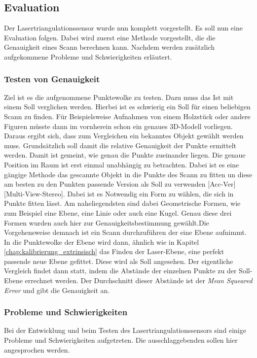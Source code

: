 	\subsection{Evaluation}
		
		Der Lasertriangulationssensor wurde nun komplett vorgestellt. Es soll nun eine Evaluation folgen. Dabei wird zuerst eine Methode vorgestellt, die die Genauigkeit eines Scann berechnen kann. Nachdem werden zusätzlich aufgekommene Probleme und Schwierigkeiten erläutert.   
		\subsubsection{Testen von Genauigkeit}
		Ziel ist es die aufgenommene Punktewolke zu testen. Dazu muss das \glqq Ist\grqq{} mit einem \glqq Soll\grqq{} verglichen werden. Hierbei ist es schwierig ein \glqq Soll\grqq{} für einen beliebigen Scann zu finden. Für Beispielsweise Aufnahmen von einem Holzstück oder andere Figuren müsste dann im vornherein schon ein genaues 3D-Modell vorliegen. Daraus ergibt sich, dass zum Vergleichen ein bekanntes Objekt gewählt werden muss. Grundsätzlich soll damit die relative Genauigkeit der Punkte ermittelt werden. Damit ist gemeint, wie genau die Punkte zueinander liegen. Die genaue Position im Raum ist erst einmal unabhängig zu betrachten. Dabei ist es eine gängige Methode das gescannte Objekt in die Punkte des Scann zu fitten un diese am besten zu den Punkten passende Version als \glqq Soll\grqq{} zu verwenden [Acc-Ver] [Multi-View-Stereo]. Dabei ist es Notwendig ein Form zu wählen, die sich in Punkte fitten lässt. Am naheliegendsten sind dabei Geometrische Formen, wie zum Beispiel eine Ebene, eine Linie oder auch eine Kugel. Genau diese drei Formen wurden auch hier zur Genauigkeitsbestimmung gewählt.Die Vorgehensweise demnach ist ein Scann durchzuführen der eine Ebene aufnimmt. In die Punktewolke der Ebene wird dann, ähnlich wie in Kapitel \ref{chap:kalibrierung_extrinsisch} das Finden der Laser-Ebene, eine perfekt passende neue Ebene gefittet. Diese wird als \glqq Soll\grqq{} angesehen. Der eigentliche Vergleich findet dann statt, indem die Abstände der einzelnen Punkte zu der \glqq Soll\grqq-Ebene errechnet werden. Der Durchschnitt dieser Abstände ist der \textit{Mean Squeared Error} und gibt die Genauigkeit an.
		\subsubsection{Probleme und Schwierigkeiten}\label{chap:probleme_schwierigkeiten}
		Bei der Entwicklung und beim Testen des Lasertriangulationssensors sind einige Probleme und Schwierigkeiten aufgetreten. Die ausschlaggebenden sollen hier angesprochen werden.
		
